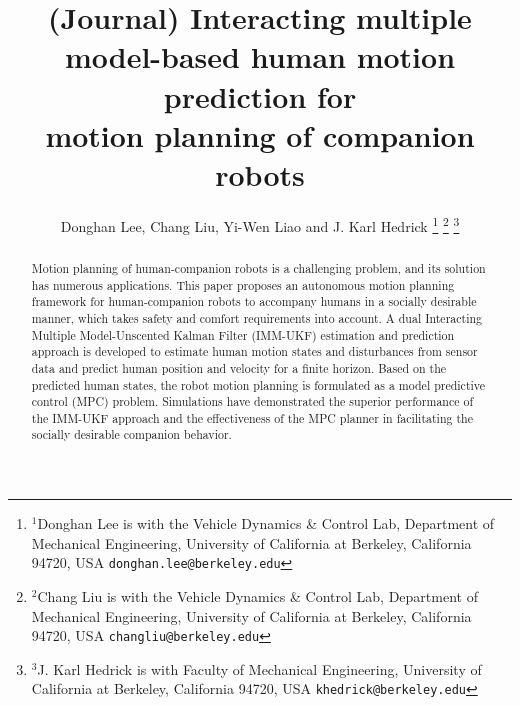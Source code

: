 \documentclass[journal]{IEEEtran}
\title{\LARGE \bf
	(Journal) Interacting multiple model-based human motion prediction for\\ motion planning of companion robots
}
\author{Donghan Lee, Chang Liu, Yi-Wen Liao and J. Karl Hedrick%
	\thanks{$^{1}$Donghan Lee is with the Vehicle Dynamics \& Control Lab, Department of Mechanical Engineering, University of California at Berkeley, California 94720, USA
		{\tt\small donghan.lee@berkeley.edu}}%
	\thanks{$^{2}$Chang Liu is with the Vehicle Dynamics \& Control Lab, Department of Mechanical Engineering, University of California at Berkeley, California 94720, USA
		{\tt\small changliu@berkeley.edu}}%
	\thanks{$^{3}$J. Karl Hedrick is with Faculty of Mechanical Engineering, University of California at Berkeley, California 94720, USA
		{\tt\small khedrick@berkeley.edu}}%
}
\begin{document}
	
	\maketitle
	\thispagestyle{empty}
	\pagestyle{empty}
	
	\setlength{\belowcaptionskip}{-1pt} %
	\begin{abstract}
		Motion planning of human-companion robots is a challenging problem, and its solution has numerous applications.
		This paper proposes an autonomous motion planning framework for human-companion robots to accompany humans in a socially desirable manner, which takes safety and comfort requirements into account.
		A dual Interacting Multiple Model-Unscented Kalman Filter (IMM-UKF) estimation and prediction approach is developed to estimate human motion states and disturbances from sensor data and predict human position and velocity for a finite horizon.
		Based on the predicted human states, the robot motion planning is formulated as a model predictive control (MPC) problem.
		Simulations have demonstrated the superior performance of the IMM-UKF approach and the effectiveness of the MPC planner in facilitating the socially desirable companion behavior.
	\end{abstract}
	
\end{document}
